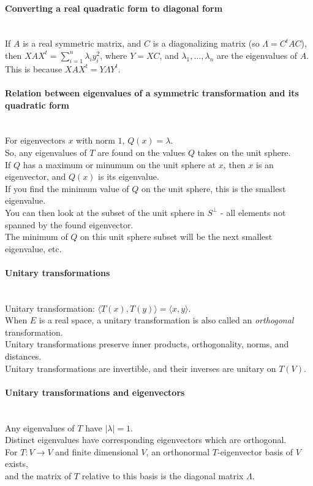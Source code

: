 \documentclass[10pt]{article}
\begin{document}
\paragraph{Converting a real quadratic form to diagonal form}\ \\
If $A$ is a real symmetric matrix, and $C$ is a diagonalizing matrix (so $\Lambda = C^t A C$),
then $X A X^t = \sum_{i=1}^n \lambda_i y_i^2$, where $Y = XC$, and $\lambda_1, \dotsc, \lambda_n$
are the eigenvalues of $A$.  This is because $X A X^t = Y \Lambda Y^t$.

\paragraph{Relation between eigenvalues of a symmetric transformation and its quadratic form}\ \\
For eigenvectors $x$ with norm $1$, $Q(x) = \lambda$.\\
So, any eigenvalues of $T$ are found on the values $Q$ takes on the unit sphere.\\
If $Q$ has a maximum or minumum on the unit sphere at $x$, then $x$ is an eigenvector, and $Q(x)$ is its eigenvalue.\\
If you find the minimum value of $Q$ on the unit sphere, this is the smallest eigenvalue.\\
You can then look at the subset of the unit sphere in $S^\bot$ - all elements not spanned by the found eigenvector.\\
The minimum of $Q$ on this unit sphere subset will be the next smallest eigenvalue, etc.

\paragraph{Unitary transformations}\ \\
Unitary transformation: $\langle T(x), T(y) \rangle = \langle x, y \rangle$.\\
When $E$ is a real space, a unitary transformation is also called an {\it orthogonal} transformation.\\
Unitary transformations preserve inner products, orthogonality, norms, and distances.\\
Unitary transformations are invertible, and their inverses are unitary on $T(V)$.

\paragraph{Unitary transformations and eigenvectors}\ \\
Any eigenvalues of $T$ have $| \lambda | = 1$.\\
Distinct eigenvalues have corresponding eigenvectors which are orthogonal.\\
For $T: V \to V$ and finite dimensional $V$, an orthonormal $T$-eigenvector basis of $V$ exists,\\
and the matrix of $T$ relative to this basis is the diagonal matrix $\Lambda$.
\end{document}

